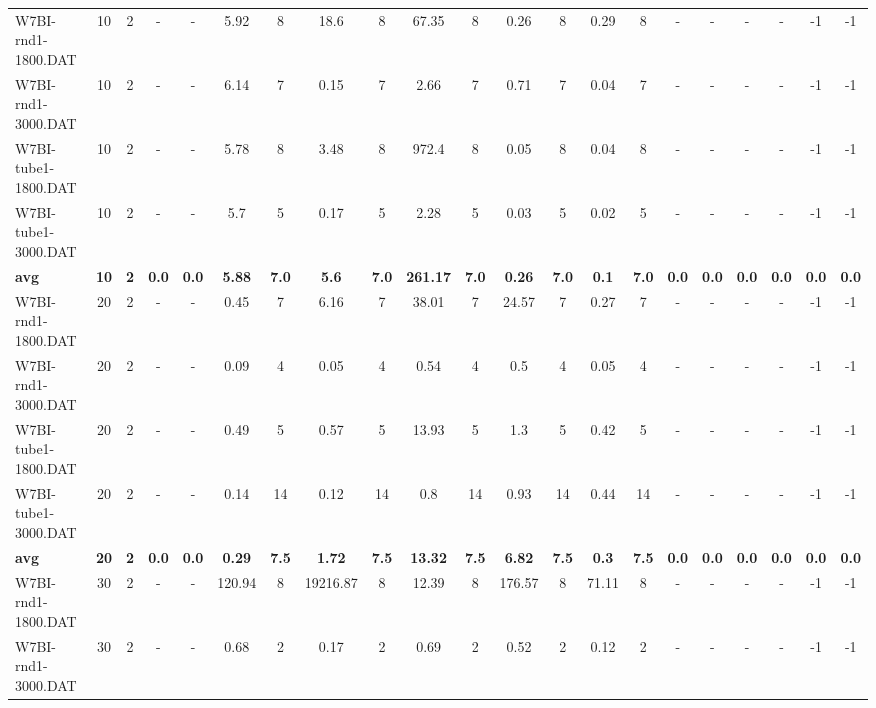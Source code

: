 \begin{sidewaystable}[!ht]
{\begin{tabular}{lcccccccccccccccccccc}
W7BI-rnd1-1800.DAT & 10 & 2 &  - &  - & 5.92 & 8 & 18.6 & 8 & 67.35 & 8 &  \textcolor{blue2}{0.26} & 8 & 0.29 & 8 &  - &  - &  - &  - & -1 & -1 \\
W7BI-rnd1-3000.DAT & 10 & 2 &  - &  - & 6.14 & 7 & 0.15 & 7 & 2.66 & 7 & 0.71 & 7 &  \textcolor{blue2}{0.04} & 7 &  - &  - &  - &  - & -1 & -1 \\
W7BI-tube1-1800.DAT & 10 & 2 &  - &  - & 5.78 & 8 & 3.48 & 8 & 972.4 & 8 & 0.05 & 8 &  \textcolor{blue2}{0.04} & 8 &  - &  - &  - &  - & -1 & -1 \\
W7BI-tube1-3000.DAT & 10 & 2 &  - &  - & 5.7 & 5 & 0.17 & 5 & 2.28 & 5 & 0.03 & 5 &  \textcolor{blue2}{0.02} & 5 &  - &  - &  - &  - & -1 & -1 \\
\cline{1-21} \textbf{avg} & \textbf{10} & \textbf{2} & \textbf{0.0} & \textbf{0.0} & \textbf{5.88} & \textbf{7.0} & \textbf{5.6} & \textbf{7.0} & \textbf{261.17} & \textbf{7.0} & \textbf{0.26} & \textbf{7.0} & \textbf{0.1} & \textbf{7.0} & \textbf{0.0} & \textbf{0.0} & \textbf{0.0} & \textbf{0.0} & \textbf{0.0} & \textbf{0.0} \\ \cline{1-21}
W7BI-rnd1-1800.DAT & 20 & 2 &  - &  - & 0.45 & 7 & 6.16 & 7 & 38.01 & 7 & 24.57 & 7 &  \textcolor{blue2}{0.27} & 7 &  - &  - &  - &  - & -1 & -1 \\
W7BI-rnd1-3000.DAT & 20 & 2 &  - &  - & 0.09 & 4 &  \textcolor{blue2}{0.05} & 4 & 0.54 & 4 & 0.5 & 4 &  \textcolor{blue2}{0.05} & 4 &  - &  - &  - &  - & -1 & -1 \\
W7BI-tube1-1800.DAT & 20 & 2 &  - &  - & 0.49 & 5 & 0.57 & 5 & 13.93 & 5 & 1.3 & 5 &  \textcolor{blue2}{0.42} & 5 &  - &  - &  - &  - & -1 & -1 \\
W7BI-tube1-3000.DAT & 20 & 2 &  - &  - & 0.14 & 14 &  \textcolor{blue2}{0.12} & 14 & 0.8 & 14 & 0.93 & 14 & 0.44 & 14 &  - &  - &  - &  - & -1 & -1 \\
\cline{1-21} \textbf{avg} & \textbf{20} & \textbf{2} & \textbf{0.0} & \textbf{0.0} & \textbf{0.29} & \textbf{7.5} & \textbf{1.72} & \textbf{7.5} & \textbf{13.32} & \textbf{7.5} & \textbf{6.82} & \textbf{7.5} & \textbf{0.3} & \textbf{7.5} & \textbf{0.0} & \textbf{0.0} & \textbf{0.0} & \textbf{0.0} & \textbf{0.0} & \textbf{0.0} \\ \cline{1-21}
W7BI-rnd1-1800.DAT & 30 & 2 &  - &  - & 120.94 & 8 & 19216.87 & 8 &  \textcolor{blue2}{12.39} & 8 & 176.57 & 8 & 71.11 & 8 &  - &  - &  - &  - & -1 & -1 \\
W7BI-rnd1-3000.DAT & 30 & 2 &  - &  - & 0.68 & 2 & 0.17 & 2 & 0.69 & 2 & 0.52 & 2 &  \textcolor{blue2}{0.12} & 2 &  - &  - &  - &  - & -1 & -1 \\

\end{tabular}}
\end{sidewaystable}
